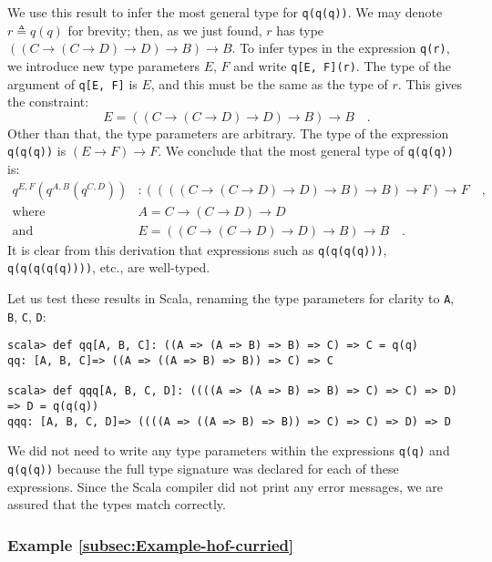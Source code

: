 We use this result to infer the most general type for \lstinline!q(q(q))!.
We may denote $r\triangleq q(q)$ for brevity; then, as we just found,
$r$ has type $\left(\left(C\rightarrow\left(C\rightarrow D\right)\rightarrow D\right)\rightarrow B\right)\rightarrow B$.
To infer types in the expression \lstinline!q(r)!, we introduce new
type parameters $E$, $F$ and write \lstinline!q[E, F](r)!. The
type of the argument of \lstinline!q[E, F]! is $E$, and this must
be the same as the type of $r$. This gives the constraint:
\[
E=\left(\left(C\rightarrow\left(C\rightarrow D\right)\rightarrow D\right)\rightarrow B\right)\rightarrow B\quad.
\]
Other than that, the type parameters are arbitrary. The type of the
expression \lstinline!q(q(q))! is $\left(E\rightarrow F\right)\rightarrow F$.
We conclude that the most general type of \lstinline!q(q(q))! is:
\begin{align*}
q^{E,F}(q^{A,B}(q^{C,D})) & :\left(\left(\left(\left(C\rightarrow\left(C\rightarrow D\right)\rightarrow D\right)\rightarrow B\right)\rightarrow B\right)\rightarrow F\right)\rightarrow F\quad,\\
\text{where}\quad & A=C\rightarrow\left(C\rightarrow D\right)\rightarrow D\\
\text{and}\quad & E=\left(\left(C\rightarrow\left(C\rightarrow D\right)\rightarrow D\right)\rightarrow B\right)\rightarrow B\quad.
\end{align*}
It is clear from this derivation that expressions such as \lstinline!q(q(q(q)))!,
\lstinline!q(q(q(q(q))))!, etc., are well-typed.

Let us test these results in Scala, renaming the type parameters for
clarity to \lstinline!A!, \lstinline!B!, \lstinline!C!, \lstinline!D!:
\begin{lstlisting}
scala> def qq[A, B, C]: ((A => (A => B) => B) => C) => C = q(q)
qq: [A, B, C]=> ((A => ((A => B) => B)) => C) => C

scala> def qqq[A, B, C, D]: ((((A => (A => B) => B) => C) => C) => D) => D = q(q(q))
qqq: [A, B, C, D]=> ((((A => ((A => B) => B)) => C) => C) => D) => D
\end{lstlisting}
We did not need to write any type parameters within the expressions
\lstinline!q(q)! and \lstinline!q(q(q))! because the full type signature
was declared for each of these expressions. Since the Scala compiler
did not print any error messages, we are assured that the types match
correctly.

\subsubsection{Example \label{subsec:Example-hof-curried}\ref{subsec:Example-hof-curried}}

